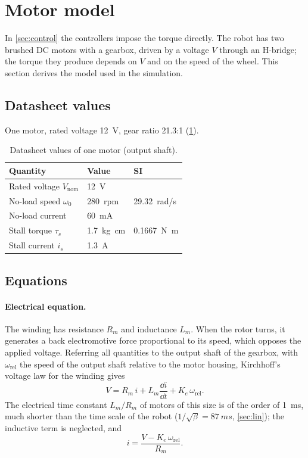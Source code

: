 \section{Motor model}\label{sec:motor}

In \cref{sec:control} the controllers impose the torque directly. The robot
has two brushed DC motors with a gearbox, driven by a voltage $V$ through an
H-bridge; the torque they produce depends on $V$ and on the speed of the
wheel. This section derives the model used in the simulation.

\subsection{Datasheet values}

One motor, rated voltage \SI{12}{V}, gear ratio 21.3:1 (\cref{tab:motor}).

\begin{table}[h]
\centering
\caption{Datasheet values of one motor (output shaft).}
\label{tab:motor}
\begin{tabular}{@{}lll@{}}
\toprule
Quantity & Value & SI \\
\midrule
Rated voltage $V_{\mathrm{nom}}$ & \SI{12}{V} & \\
No-load speed $\omega_0$ & \SI{280}{rpm} & \SI{29.32}{rad/s} \\
No-load current & \SI{60}{mA} & \\
Stall torque $\tau_s$ & \SI{1.7}{kg.cm} & \SI{0.1667}{N.m} \\
Stall current $i_s$ & \SI{1.3}{A} & \\
\bottomrule
\end{tabular}
\end{table}

\subsection{Equations}

\paragraph{Electrical equation.} The winding has resistance $R_m$ and
inductance $L_m$. When the rotor turns, it generates a back electromotive
force proportional to its speed, which opposes the applied voltage. Referring
all quantities to the output shaft of the gearbox, with $\omega_{\mathrm{rel}}$
the speed of the output shaft relative to the motor housing, Kirchhoff's
voltage law for the winding gives
\begin{equation}
  V = R_m\,i + L_m\frac{\dd i}{\dd t} + K_e\,\omega_{\mathrm{rel}} .
\end{equation}
The electrical time constant $L_m/R_m$ of motors of this size is of the order
of \SI{1}{ms}, much shorter than the time scale of the robot
($1/\sqrt\beta = \SI{87}{ms}$, \cref{sec:lin}); the inductive term is
neglected, and
\begin{equation}
  i = \frac{V - K_e\,\omega_{\mathrm{rel}}}{R_m} .
\end{equation}

